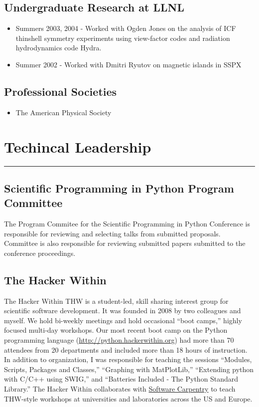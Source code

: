 \documentclass[letterpaper,11pt]{article}
\begin{document}
\subsection*{Undergraduate Research at LLNL}
\begin{itemize}
	\item Summers 2003, 2004 - Worked with Ogden Jones on the analysis of ICF thinshell symmetry experiments using view-factor codes and radiation hydrodynamics code Hydra.
	\item Summer 2002 -  Worked with Dmitri Ryutov on magnetic islands in SSPX
\end{itemize}

\subsection*{Professional Societies}
\begin{itemize}
	\item The American Physical Society
\end{itemize}

\pagebreak

\section*{Techincal Leadership}
\hrule
\vspace{0.05in}

\subsection*{Scientific Programming in Python Program Committee}
The Program Commitee for the Scientific Programming in Python Conference is
responsible for reviewing and selecting talks from submitted proposals.
Committee is also responsible for reviewing submitted papers submitted to the
conference proceedings.

\subsection*{The Hacker Within}
The Hacker Within THW is a student-led, skill sharing interest group for
scientific software development.  It was founded in 2008 by two colleagues and
myself.  We hold bi-weekly meetings and hold occasional ``boot camps,'' highly
focused multi-day workshops.  Our most recent boot camp on the Python
programming language (\url{http://python.hackerwithin.org}) had more than 70
attendees from 20 departments and included more than 18 hours of instruction.
In addition to organization, I was responsible for teaching the sessions
``Modules, Scripts, Packages and Classes,''  ``Graphing with MatPlotLib,''
``Extending python with C/C++ using SWIG,''  and ``Batteries Included - The
Python Standard Library.''  The Hacker Within collaborates with
\href{software-carpentry.org}{Software Carpentry} to teach THW-style workshops
at universities and laboratories across the US and Europe.
\end{document}
